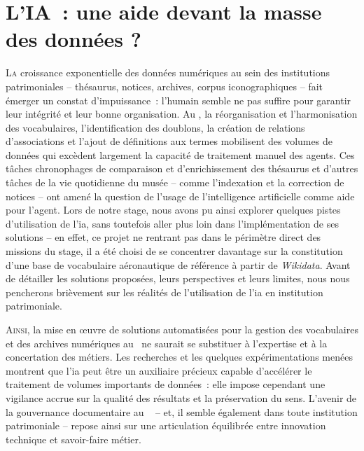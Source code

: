 \chapter[Apports de l'\ac{ia}]{\label{III-C}L'IA~: une aide devant la masse des données ?}





\lettrine{L}a croissance exponentielle des données numériques au sein des institutions patrimoniales -- thésaurus, notices, archives, corpus iconographiques -- fait émerger un constat d’impuissance~: l’humain semble ne pas suffire pour garantir leur intégrité et leur bonne organisation. Au \mae, la réorganisation et l'harmonisation des vocabulaires, l’identification des doublons, la création de relations d'associations et l'ajout de définitions aux termes mobilisent des volumes de données qui excèdent largement la capacité de traitement manuel des agents. Ces tâches chronophages de comparaison et d'enrichissement des thésaurus et d'autres tâches de la vie quotidienne du musée -- comme l'indexation et la correction de notices -- ont amené la question de l'usage de l'intelligence artificielle comme aide pour l'agent. Lors de notre stage, nous avons pu ainsi explorer quelques pistes d'utilisation de l'\ac{ia}, sans toutefois aller plus loin dans l'implémentation de ses solutions -- en effet, ce projet ne rentrant pas dans le périmètre direct des missions du stage, il a été choisi de se concentrer davantage sur la constitution d'une base de vocabulaire aéronautique de référence à partir de \textit{Wikidata}. Avant de détailler les solutions proposées, leurs perspectives et leurs limites, nous nous pencherons brièvement sur les réalités de l'utilisation de l'\ac{ia} en institution patrimoniale. 













\bigskip

\bigskip

\bigskip



\lettrine{A}{insi}, la mise en œuvre de solutions automatisées pour la gestion des vocabulaires et des archives numériques au \mae~ne saurait se substituer à l’expertise et à la concertation des métiers. Les recherches et les quelques expérimentations menées montrent que l'\ac{ia} peut être un auxiliaire précieux capable d’accélérer le traitement de volumes importants de données~: elle impose cependant une vigilance accrue sur la qualité des résultats et la préservation du sens. L'avenir de la gouvernance documentaire au \mae~ -- et, il semble également dans toute institution patrimoniale -- repose ainsi sur une articulation équilibrée entre innovation technique et savoir-faire métier.